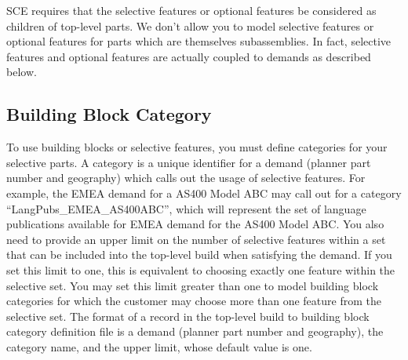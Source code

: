 SCE requires that the selective features or optional features be
considered as children of top-level parts.  We don't allow you to
model selective features or optional features for parts which are
themselves subassemblies.  In fact, selective features and optional
features are actually coupled to demands as described below.

\subsection{Building Block Category}
To use building blocks or selective features, you must define
categories for your selective parts.  A category is a unique
identifier for a demand (planner part number and geography) which
calls out the usage of selective features.  For example, the EMEA
demand for a AS400 Model ABC may call out for a category
``LangPubs\_EMEA\_AS400ABC'', which will represent the set of language
publications available for EMEA demand for the AS400 Model ABC.  You
also need to provide an upper limit on the number of selective
features within a set that can be included into the top-level build
when satisfying the demand.  If you set this limit to one, this is
equivalent to choosing exactly one feature within the selective set.
You may set this limit greater than one to model building block
categories for which the customer may choose more than one feature
from the selective set.  The format of a record in the top-level build to
building block category definition file is a demand (planner part number and
geography), the category name, and the upper limit, whose default value is one.

